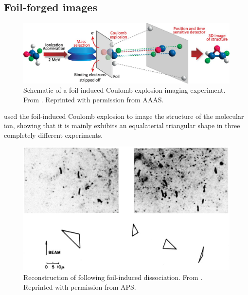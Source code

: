 
\subsection{Foil-forged images}


\begin{figure}
  \centering
  \includegraphics[width=\textwidth]{gfx/FoilExperiment}
  \caption[Schematic of a foil-induced Coulomb explosion imaging experiment.]
  {Schematic of a foil-induced Coulomb explosion imaging experiment. From \citet{Herwig13}. Reprinted with permission from AAAS.}
\end{figure}

\citet{Gaillard78} used the foil-induced Coulomb explosion to image the structure of the  molecular ion, showing that it is mainly exhibits an equalaterial triangular shape in three completely different experiments.\footnotemark


\begin{figure}
  \centering
  \includegraphics[width=\textwidth]{gfx/HydrogenTrimerReconstruction}
  \caption[Reconstruction of  following foil-induced dissociation.]
  {Reconstruction of  following foil-induced dissociation. From \citet{Gaillard78}. Reprinted with permission from APS.}
\end{figure}

